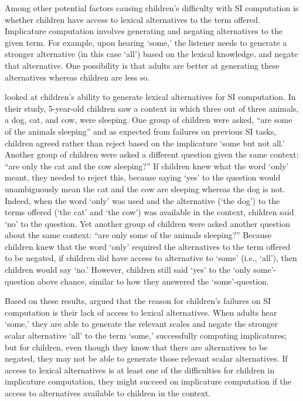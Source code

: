 \documentclass[10pt,letterpaper]{article}
\begin{document}
Among other potential factors causing children's difficulty with SI computation is whether children have access to lexical alternatives to the term offered. Implicature computation involves generating and negating alternatives to the given term. For example, upon hearing `some,' the listener needs to generate a stronger alternative (in this case `all') based on the lexical knowledge, and negate that alternative. One possibility is that adults are better at generating these alternatives whereas children are less so.

 looked at children's ability to generate lexical alternatives for SI computation. In their study, 5-year-old children saw a context in which three out of three animals, a dog, cat, and cow, were sleeping. One group of children were asked, ``are some of the animals sleeping'' and as expected from failures on previous SI tasks, children agreed rather than reject based on the implicature `some but not all.' Another group of children were asked a different question given the same context: ``are only the cat and the cow sleeping?'' If children knew what the word `only' meant, they needed to reject this, because saying `yes' to the question would unambiguously mean the cat and the cow are sleeping whereas the dog is not. Indeed, when the word `only' was used and the alternative (`the dog') to the terms offered (`the cat' and `the cow') was available in the context, children said `no' to the question. Yet another group of children were asked another question about the same context: ``are only some of the animals sleeping?'' Because children knew that the word `only' required the alternatives to the term offered to be negated, if children did have access to alternative to `some' (i.e., `all'), then children would say `no.' However, children still said `yes' to the `only some'-question above chance, similar to how they answered the `some'-question.

Based on these results,  argued that the reason for children's failures on SI computation is their lack of access to lexical alternatives. When adults hear `some,' they are able to generate the relevant scales and negate the stronger scalar alternative `all' to the term `some,' successfully computing implicatures; but for children, even though they know that there are alternatives to be negated, they may not be able to generate those relevant scalar alternatives. If access to lexical alternatives is at least one of the difficulties for children in implicature computation, they might succeed on implicature computation if the access to alternatives available to children in the context. 
\end{document}
